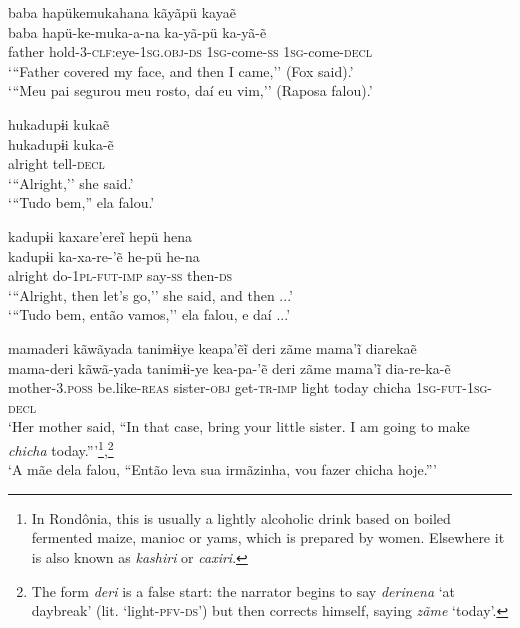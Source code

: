 \documentclass[output=paper,
modfonts,nonflat
]{langsci/langscibook}
\begin{document}
\ea   baba hapükemukahana kãyãpü kayaẽ \\[.3em]
\gll baba hapü-ke-muka-a-na ka-yã-pü ka-yã-ẽ\\
father hold-\textsc{3-clf:}eye-\textsc{1sg.obj-ds} \textsc{1sg}-come-\textsc{ss} \textsc{1sg}-come-\textsc{decl}\\
\glt    `{``}Father covered my face, and then I came,'' (Fox said).'\\
`{``}Meu pai segurou meu rosto, daí eu vim,'' (Raposa falou).'\\
\z

\ea   hukadupɨi kukaẽ \\[.3em]
\gll hukadupɨi kuka-ẽ \\
alright tell-\textsc{decl}\\
\glt  `{``}Alright,'' she said.' \\
`{``}Tudo bem,{''} ela falou.' \\
\z

\ea  kadupɨi kaxare'ereĩ hepü hena \\[.3em]
\gll kadupɨi ka-xa-re-'ẽ he-pü he-na\\
alright do-\textsc{1pl-fut-imp} say-\textsc{ss} then-\textsc{ds}  \\
\glt    `{``}Alright, then let's go,'' she said, and then ...'\\
`{``}Tudo bem, então vamos,'' ela falou, e daí ...'\\
\z



\newpage 
\ea   mamaderi kãwãyada tanimɨiye keapa'ẽĩ  deri zãme mama'ĩ diarekaẽ \\[.3em]
\gll mama-deri kãwã-yada tanimɨi-ye kea-pa-'ẽ deri zãme mama'ĩ dia-re-ka-ẽ\\
mother-\textsc{3.poss} be.like-\textsc{reas} sister-\textsc{obj} get-\textsc{tr-imp} light today chicha \textsc{1sg-fut-1sg-decl} \\
\glt    `Her mother said, ``In that case, bring your little sister. I am going to make \textit{chicha} today.{''}'\footnote{In Rondônia, this is usually a lightly alcoholic drink based on boiled fermented maize, manioc or yams, which is prepared by women. Elsewhere it is also known as \textit{kashiri} or \textit{caxiri}.},\footnote{The form \textit{deri} is a false start: the narrator begins to say \textit{derinena} `at daybreak' (lit. `light-\textsc{pfv-ds}') but then corrects himself, saying \textit{zãme} `today'.}\\
 `A mãe dela falou, ``Então leva sua irmãzinha, vou fazer chicha hoje.{''}'
\z
\end{document}
